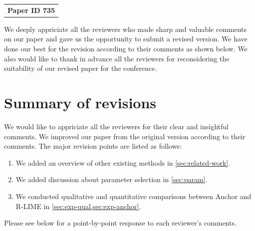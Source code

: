 \documentclass[runningheads]{llncs}
\def\paperID{735} %
\begin{document}
\begin{center}
  \vspace*{-22pt}
  \begin{tabular}[t]{c}{
      \large\bf
      Paper ID \paperID{}
    }
  \end{tabular}
  \par
\end{center}
We deeply appriciate all the reviewers who made sharp and valuable comments
on our paper and gave us the opportunity to submit a revised version.
We have done our best for the revision according to their comments as shown below.
We also would like to thank in advance all the reviewers for reconsidering
the suitability of our revised paper for the conference.

\section*{Summary of revisions}
We would like to appriciate all the reviewers for their clear and insightful
comments.
We improved our paper from the original version according to their comments.
The major revision points are listed as follows:
\begin{enumerate}
  \item We added an overview of other existing methods in \cref{sec:related-work}.
  \item We added discussion about parameter selection in \cref{sec:param}.
  \item We conducted qualitative and quantitative comparisons
        between Anchor and R-LIME in \cref{sec:exp-qual,sec:exp-anchor}.
\end{enumerate}
Please see below for a point-by-point response to each reviewer's comments.

\newenvironment{mycomment}{
  \vspace{10pt}\hspace{.02\textwidth}\begin{minipage}{.92\textwidth}
    }{\end{minipage}}
\end{document}
